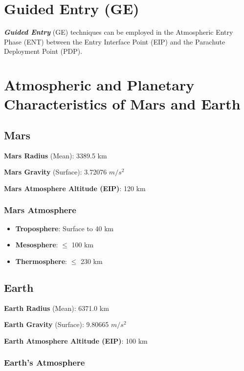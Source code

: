 
\section{Guided Entry (GE)}

    \textbf{\textit{Guided Entry}} (GE) techniques can be employed in the Atmospheric Entry Phase (ENT)
    between the Entry Interface Point (EIP) and the Parachute Deployment Point (PDP).

\section{Atmospheric and Planetary Characteristics of Mars and Earth}

    \subsection{Mars}

        \textbf{Mars Radius} (Mean): 3389.5 km

        \textbf{Mars Gravity} (Surface): 3.72076 $m/s^2$

        \textbf{Mars Atmosphere Altitude (EIP)}: 120 km

        \subsubsection{Mars Atmosphere}

            \begin{itemize}
                \item \textbf{Troposphere}: Surface to 40 km
                \item \textbf{Mesosphere}: $\leq$ 100 km
                \item \textbf{Thermosphere}: $\leq$ 230 km
            \end{itemize}


    \subsection{Earth}

        \textbf{Earth Radius} (Mean): 6371.0 km

        \textbf{Earth Gravity} (Surface): 9.80665 $m/s^2$

        \textbf{Earth Atmosphere Altitude (EIP)}: 100 km

        \subsubsection{Earth's Atmosphere}

